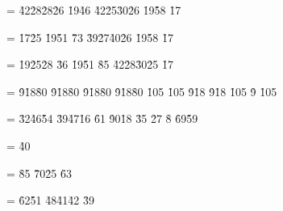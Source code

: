 \setbox\boxN= 
\vbox{\ofi 
{} {\h{42}\h{28}\h{28}\h{26}} %
 {\h{19}\h{46}} %
 {\h{42}\h{25}\h{30}\h{26}} %
 {\h{19}\h{58}} %
 {\h{17}} 
\vskip 2mm 
 } 
 
\setbox\boxO= 
\vbox{\ofi 
{} {\h{17}\h{25}} 
 {\h{19}\h{51}} %
 {\h{73}} %
 {\h{39}\h{27}\h{40}\h{26}} %
 {\h{19}\h{58}} %
 {\h{17}} 
\vskip 2mm 
 } 
 
 
\setbox\boxP= 
\vbox{\ofi 
{} {\h{19}\h{25}\h{28}} 
 {\h{36}} 
 {\h{19}\h{51}} %
 {\h{85}} %
 {\h{42}\s{}\h{28}\s{}\h{30}\h{25}} %
 {\h{17}} 
\vskip 2mm 
 }   


\setbox\boxQ=   %
\vbox{\ofi
{} {}
 {\h{9}\h{18}\h{80}}
 {\h{9}\h{18}\h{80}}
 {}
 {\h{9}\h{18}\h{80}}
 {\h{9}\h{18}\h{80}}
 {\h{105}\s{\alpha_+}} %
 {}
 {\h{105}}
 {\h{9}\h{18}}
 {\h{9}\h{18}}
 {\h{105}} %
 {\h{9}}
 {\h{105}\s{\alpha_-}}
\vskip 2mm
 }

\setbox\boxR=
\vbox{\ofi
{} {\h{32}\h{46}\h{54}}
 {\h{39}\s{\xi}\h{47}\h{16}} %
 {\h{61}} %
 {\h{90}\h{18}} %
 {\h{35}}
 {\h{27}}
 {\h{8}}
 {\h{69}\h{59}\s{\xi}} %
\vskip 2mm
 }

\setbox\boxS=
\vbox{\ofi
{} {\h{40}}
\vskip 4mm
 }

\setbox\boxT=
\vbox{\ofi
{} {\h{85}}
 {\h{70}\h{25}}
 {\h{63}}
\vskip 4mm
}

\setbox\boxU=
\vbox{\ofi
{} {\h{62}\h{51}}
 {\h{48}\h{41}\h{42}}
 {\h{39}}
\vskip 4mm
}

